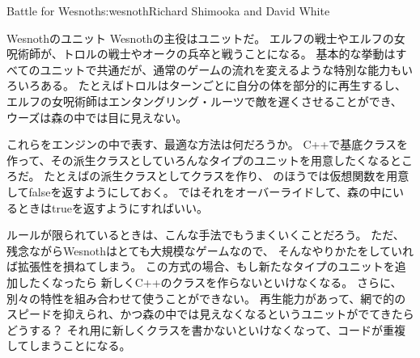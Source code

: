 \begin{aosachapter}{Battle for Wesnoth}{s:wesnoth}{Richard Shimooka and David White}
\begin{aosasect1}{Wesnothのユニット}
Wesnothの主役はユニットだ。
エルフの戦士やエルフの女呪術師が、トロルの戦士やオークの兵卒と戦うことになる。
基本的な挙動はすべてのユニットで共通だが、通常のゲームの流れを変えるような特別な能力もいろいろある。
たとえばトロルはターンごとに自分の体を部分的に再生するし、
エルフの女呪術師はエンタングリング・ルーツで敵を遅くさせることができ、
ウーズは森の中では目に見えない。

これらをエンジンの中で表す、最適な方法は何だろうか。
C++で基底クラスを作って、その派生クラスとしていろんなタイプのユニットを用意したくなるところだ。
たとえばの派生クラスとしてクラスを作り、
のほうでは仮想関数を用意してfalseを返すようにしておく。
ではそれをオーバーライドして、森の中にいるときはtrueを返すようにすればいい。

ルールが限られているときは、こんな手法でもうまくいくことだろう。
ただ、残念ながらWesnothはとても大規模なゲームなので、
そんなやりかたをしていれば拡張性を損ねてしまう。
この方式の場合、もし新たなタイプのユニットを追加したくなったら
新しくC++のクラスを作らないといけなくなる。
さらに、別々の特性を組み合わせて使うことができない。
再生能力があって、網で的のスピードを抑えられ、かつ森の中では見えなくなるというユニットがでてきたらどうする？
それ用に新しくクラスを書かないといけなくなって、コードが重複してしまうことになる。


\end{aosasect1}
\end{aosachapter}
